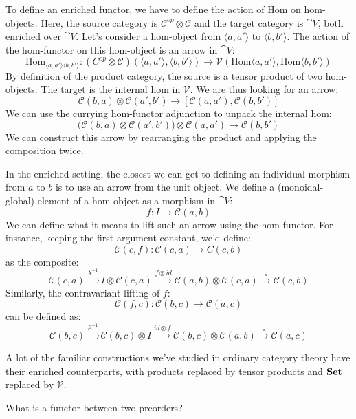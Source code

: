 \documentclass[DaoFP]{subfiles}
\begin{document}
To define an enriched functor, we have to define the action of $\text{Hom}$ on hom-objects. Here, the source category is $\mathcal C^{op} \otimes \mathcal C$ and the target category is $\cat V$, both enriched over $\cat V$. Let's consider a hom-object from $\langle a, a' \rangle$ to $\langle b, b' \rangle$. The action of the hom-functor on this hom-object is an arrow in $\cat V$:
\[ \text{Hom}_{\langle a, a' \rangle \langle b, b' \rangle} \colon (C^{op} \otimes \mathcal C)(\langle a, a' \rangle, \langle b, b' \rangle) \to \mathcal V (\text{Hom}\langle a, a' \rangle, \text{Hom}\langle b, b' \rangle)\]
By definition of the product category, the source is a tensor product of two hom-objects. The target is the internal hom in $\mathcal V$. We are thus looking for an arrow:
\[ \mathcal C(b, a) \otimes \mathcal C(a', b') \to [\mathcal C(a, a'), \mathcal C(b, b')] \]
We can use the currying hom-functor adjunction to unpack the internal hom:
\[ \Big( \mathcal C(b, a) \otimes \mathcal C(a', b') \Big) \otimes \mathcal C(a, a') \to \mathcal C(b, b') \]
We can construct this arrow by rearranging the product and applying the composition twice.

In the enriched setting, the closest we can get to defining an individual morphism from $a$ to $b$ is to use an arrow from the unit object. We define a (monoidal-global) element of a hom-object as a morphism in $\cat V$:
\[ f \colon I \to \mathcal C(a, b) \]
We can define what it means to lift such an arrow using the hom-functor. For instance, keeping the first argument constant, we'd define:
\[ \mathcal C(c, f) \colon \mathcal C(c, a) \to C(c, b) \] 
as the composite:
\[ \mathcal C(c, a) \xrightarrow{\lambda^{-1}} I \otimes \mathcal C(c, a) \xrightarrow{f \otimes id} \mathcal C(a, b) \otimes \mathcal C(c, a) \xrightarrow{\circ} \mathcal C(c, b) \]
Similarly, the contravariant lifting of $f$:
\[ \mathcal C(f, c) \colon \mathcal C(b, c) \to \mathcal C(a, c) \]
can be defined as:
\[ \mathcal C(b, c) \xrightarrow{\rho^{-1}} \mathcal C(b, c) \otimes I \xrightarrow{id \otimes f} \mathcal C (b, c) \otimes \mathcal C(a, b) \xrightarrow{\circ} \mathcal C(a, c) \]

A lot of the familiar constructions we've studied in ordinary category theory have their enriched counterparts, with products replaced by tensor products and $\mathbf{Set}$ replaced by $\mathcal V$.

\begin{exercise}
What is a functor between two preorders?
\end{exercise}
\end{document}
